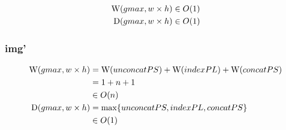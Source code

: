       \begin{equation}
      \begin{split}
      \textrm{W}(gmax,w \times h)
            & \in O(1) \\
      \textrm{D}(gmax, w \times h)
            & \in O(1) \\
      \end{split}
      \end{equation}
      
    \subsubsection{img'}
      \begin{equation}
      \begin{split}
      \textrm{W}(gmax, w \times h)
            & = \textrm{W}(unconcatPS) + \textrm{W}(indexPL) + \textrm{W}(concatPS) \\
            & = 1 + n + 1 \\
            & \in O(n) \\
      \textrm{D}(gmax, w \times h)
          & = \max \{ unconcatPS, indexPL, concatPS \} \\
          & \in O(1)
      \end{split}
      \end{equation}
    


